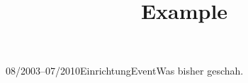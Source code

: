 \documentclass[a4paper]{article}
\title{Example}
\begin{document}
\blindtext{}

\blindtext{}

\begin{eventlist}
	\item{08/2003--07/2010}{Einrichtung}{Event}{Was bisher geschah.}
\end{eventlist}
\blindtext{}
\newpage
\end{document}
